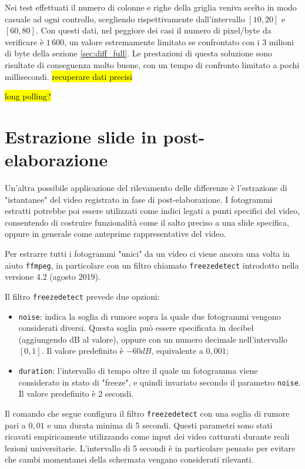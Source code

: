 Nei test effettuati il numero di colonne e righe della griglia veniva scelto in modo casuale ad ogni controllo, scegliendo rispettivamente dall'intervallo $[10, 20]$ e $[60, 80]$. Con questi dati, nel peggiore dei casi il numero di pixel/byte da verificare è $1\,600$, un valore estremamente limitato se confrontato con i 3 milioni di byte della sezione \ref{sec:diff_full}. Le prestazioni di questa soluzione sono risultate di conseguenza molto buone, con un tempo di confronto limitato a pochi millisecondi. \hl{recuperare dati precisi}

\hl{long polling?}

\section{Estrazione slide in post-elaborazione}
\label{sec:diff_postprod}

Un'altra possibile applicazione del rilevamento delle differenze è l'estrazione di "istantanee" del video registrato in fase di post-elaborazione. I fotogrammi estratti potrebbe poi essere utilizzati come indici legati a punti specifici del video, consentendo di costruire funzionalità come il salto preciso a una slide specifica, oppure in generale come anteprime rappresentative del video.

Per estrarre tutti i fotogrammi "unici" da un video ci viene ancora una volta in aiuto \texttt{ffmpeg}, in particolare con un filtro chiamato \texttt{freezedetect} introdotto nella versione 4.2 (agosto 2019).\cite{ffmpeg}

Il filtro \texttt{freezedetect} prevede due opzioni:

\begin{itemize}
	\item \texttt{noise}: indica la soglia di rumore sopra la quale due fotogrammi vengono considerati diversi. Questa soglia può essere specificata in decibel (aggiungendo dB al valore), oppure con un numero decimale nell'intervallo $[0, 1]$. Il valore predefinito è $-60 dB$, equivalente a $0,001$;
	\item \texttt{duration}: l'intervallo di tempo oltre il quale un fotogramma viene considerato in stato di "freeze", e quindi invariato secondo il parametro \texttt{noise}. Il valore predefinito è 2 secondi.
\end{itemize}

Il comando che segue configura il filtro \texttt{freezedetect} con una soglia di rumore pari a $0,01$ e una durata minima di 5 secondi. Questi parametri sono stati ricavati empiricamente utilizzando come input dei video catturati durante reali lezioni universitarie. L'intervallo di 5 secondi è in particolare pensato per evitare che cambi momentanei della schermata vengano considerati rilevanti.

